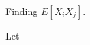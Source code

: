 \documentclass[hwnumber=4,studentnumber=20053722]{mthe353answer}
\begin{document}
  \begin{questions}
    \setcounter{question}{1}
    \question{}
    Finding \(E[X_i X_j]\).
    \begin{solution}
      Let
    \end{solution}
  \end{questions}
\end{document}
